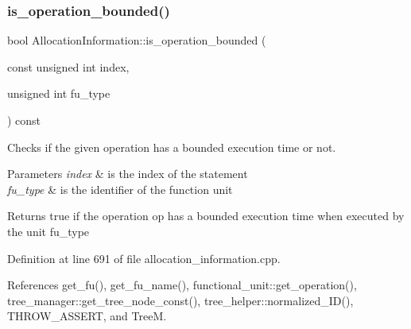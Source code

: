 \subsubsection{\texorpdfstring{is\+\_\+operation\+\_\+bounded()}{is\_operation\_bounded()}\hspace{0.1cm}{\footnotesize\ttfamily [2/3]}}
{\footnotesize\ttfamily bool Allocation\+Information\+::is\+\_\+operation\+\_\+bounded (\begin{DoxyParamCaption}\item[{const unsigned int}]{index,  }\item[{unsigned int}]{fu\+\_\+type }\end{DoxyParamCaption}) const}



Checks if the given operation has a bounded execution time or not. 


\begin{DoxyParams}{Parameters}
{\em index} & is the index of the statement \\
\hline
{\em fu\+\_\+type} & is the identifier of the function unit \\
\hline
\end{DoxyParams}
\begin{DoxyReturn}{Returns}
true if the operation op has a bounded execution time when executed by the unit fu\+\_\+type 
\end{DoxyReturn}


Definition at line 691 of file allocation\+\_\+information.\+cpp.



References get\+\_\+fu(), get\+\_\+fu\+\_\+name(), functional\+\_\+unit\+::get\+\_\+operation(), tree\+\_\+manager\+::get\+\_\+tree\+\_\+node\+\_\+const(), tree\+\_\+helper\+::normalized\+\_\+\+I\+D(), T\+H\+R\+O\+W\+\_\+\+A\+S\+S\+E\+RT, and TreeM.

